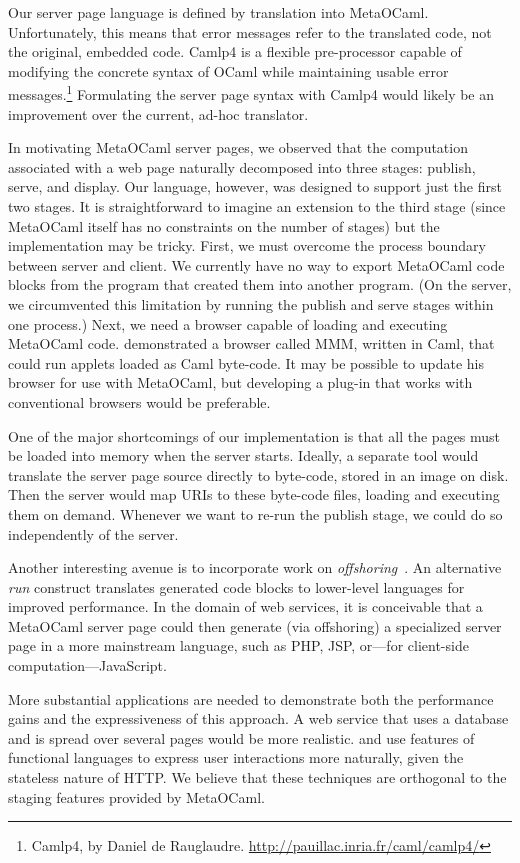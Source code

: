 \documentclass{elsart}
\def\MOC{MetaOCaml\xspace}
\begin{document}
Our server page language is defined by translation into \MOC.
Unfortunately, this means that error messages refer to the translated
code, not the original, embedded code.  Camlp4 is a flexible
pre-processor capable of modifying the concrete syntax of OCaml while
maintaining usable error messages.\footnote{Camlp4, by Daniel de
  Rauglaudre.  \url{http://pauillac.inria.fr/caml/camlp4/}}
Formulating the server page syntax with Camlp4 would likely be an
improvement over the current, ad-hoc translator.

In motivating \MOC server pages, we observed that the computation
associated with a web page naturally decomposed into three stages:
publish, serve, and display.  Our language, however, was designed to
support just the first two stages.  It is straightforward to imagine
an extension to the third stage (since \MOC itself has no constraints
on the number of stages) but the implementation may be tricky.  First,
we must overcome the process boundary between server and client.  We
currently have no way to export \MOC code blocks from the program that
created them into another program.  (On the server, we circumvented
this limitation by running the publish and serve stages within one
process.)  Next, we need a browser capable of loading and executing
\MOC code.  \citet{rouaix96web} demonstrated a browser called MMM,
written in Caml, that could run applets loaded as Caml byte-code.  It
may be possible to update his browser for use with \MOC, but
developing a plug-in that works with conventional browsers would be
preferable.

One of the major shortcomings of our implementation is that all the
pages must be loaded into memory when the server starts.  Ideally, a
separate tool would translate the server page source directly to
byte-code, stored in an image on disk.  Then the server would map URIs
to these byte-code files, loading and executing them on demand.
Whenever we want to re-run the publish stage, we could do so
independently of the server.  

Another interesting avenue is to incorporate work on
\emph{offshoring}~\cite{eckhardt04offshoring}.  An alternative
\emph{run} construct translates generated code blocks to lower-level
languages for improved performance.  In the domain of web services, it
is conceivable that a \MOC server page could then generate (via
offshoring) a specialized server page in a more mainstream language,
such as PHP, JSP, or---for client-side computation---JavaScript.

More substantial applications are needed to demonstrate both the
performance gains and the expressiveness of this approach.  A web
service that uses a database and is spread over several pages would be
more realistic.  \citet{queinnec00influence} and
\citet{graunke01programming} use features of functional languages to
express user interactions more naturally, given the stateless nature
of HTTP.  We believe that these techniques are orthogonal to the
staging features provided by \MOC.
\end{document}
